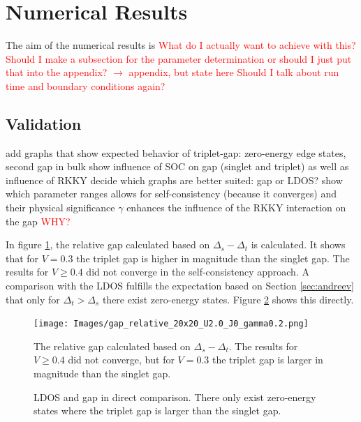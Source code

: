 \newpage
\section{Numerical Results}
The aim of the numerical results is \textcolor{red}{What do I actually want to achieve with this?}\newline
\textcolor{red}{Should I make a subsection for the parameter determination or should I just put that into the appendix? $\rightarrow$ appendix, but state here} \newline
\textcolor{red}{Should I talk about run time and boundary conditions again?}

\subsection{Validation}
add graphs that show expected behavior of triplet-gap: zero-energy edge states, second gap in bulk \newline
show influence of SOC on gap (singlet and triplet) as well as influence of RKKY\newline
decide which graphs are better suited: gap or LDOS? \newline
show which parameter ranges allows for self-consistency (because it converges) and their physical significance \newline
$\gamma$ enhances the influence of the RKKY interaction on the gap \textcolor{red}{WHY?} \newline

In figure \ref{fig:relative_gap}, the relative gap calculated based on $\Delta_s - \Delta_t$ is calculated.
It shows that for $V=0.3$ the triplet gap is higher in magnitude than the singlet gap.
The results for $V \geq 0.4$ did not converge in the self-consistency approach.
A comparison with the LDOS fulfills the expectation based on Section \ref{sec:andreev} that only for $\Delta_t > \Delta_s$ there exist zero-energy states.
Figure \ref{fig:ldos_gap_andreev} shows this directly.

\begin{figure}[h!]
    \centering
    \texttt{[image: Images/gap\_relative\_20x20\_U2.0\_J0\_gamma0.2.png]}
    \caption{The relative gap calculated based on $\Delta_s - \Delta_t$. The results for $V \geq 0.4$ did not converge, but for $V=0.3$ the triplet gap is larger in magnitude than the singlet gap.}
    \label{fig:relative_gap}
\end{figure}

\begin{figure}[H]
    \centering
    \label{fig:ldos_gap_andreev}
    \caption{LDOS and gap in direct comparison. There only exist zero-energy states where the triplet gap is larger than the singlet gap.}
\end{figure}

